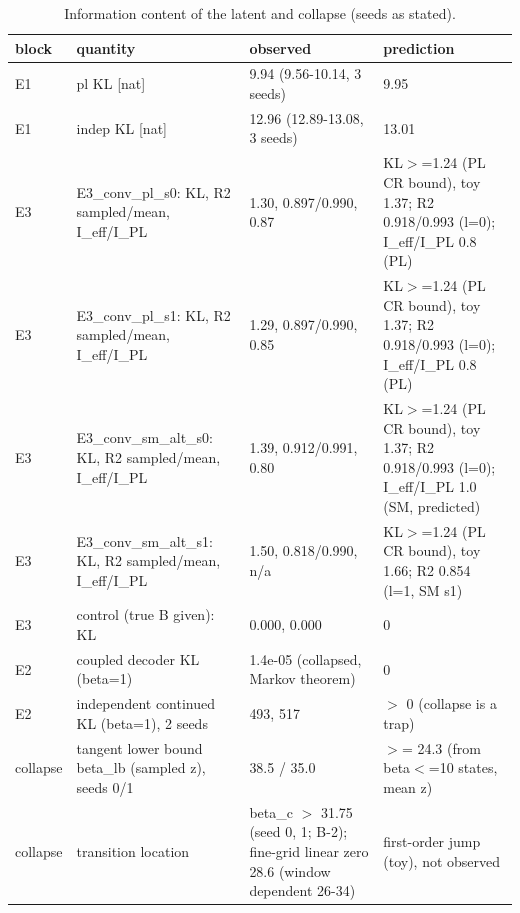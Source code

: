 \begin{table}[t]
\centering
\small
\caption{Information content of the latent and collapse (seeds as stated).}
\label{tab:information}
\begin{tabular}{llll}
\toprule
block & quantity & observed & prediction \\
\midrule
E1 & pl KL [nat] & 9.94 (9.56-10.14, 3 seeds) & 9.95 \\
E1 & indep KL [nat] & 12.96 (12.89-13.08, 3 seeds) & 13.01 \\
E3 & E3\_conv\_pl\_s0: KL, R2 sampled/mean, I\_eff/I\_PL & 1.30, 0.897/0.990, 0.87 & KL$>$=1.24 (PL CR bound), toy 1.37; R2 0.918/0.993 (l=0); I\_eff/I\_PL 0.8 (PL) \\
E3 & E3\_conv\_pl\_s1: KL, R2 sampled/mean, I\_eff/I\_PL & 1.29, 0.897/0.990, 0.85 & KL$>$=1.24 (PL CR bound), toy 1.37; R2 0.918/0.993 (l=0); I\_eff/I\_PL 0.8 (PL) \\
E3 & E3\_conv\_sm\_alt\_s0: KL, R2 sampled/mean, I\_eff/I\_PL & 1.39, 0.912/0.991, 0.80 & KL$>$=1.24 (PL CR bound), toy 1.37; R2 0.918/0.993 (l=0); I\_eff/I\_PL 1.0 (SM, predicted) \\
E3 & E3\_conv\_sm\_alt\_s1: KL, R2 sampled/mean, I\_eff/I\_PL & 1.50, 0.818/0.990, n/a & KL$>$=1.24 (PL CR bound), toy 1.66; R2 0.854 (l=1, SM s1) \\
E3 & control (true B given): KL & 0.000, 0.000 & 0 \\
E2 & coupled decoder KL (beta=1) & 1.4e-05 (collapsed, Markov theorem) & 0 \\
E2 & independent continued KL (beta=1), 2 seeds & 493, 517 & $>$ 0 (collapse is a trap) \\
collapse & tangent lower bound beta\_lb (sampled z), seeds 0/1 & 38.5 / 35.0 & $>$= 24.3 (from beta$<$=10 states, mean z) \\
collapse & transition location & beta\_c $>$ 31.75 (seed 0, 1; B-2); fine-grid linear zero 28.6 (window dependent 26-34) & first-order jump (toy), not observed \\
\bottomrule
\end{tabular}
\end{table}
